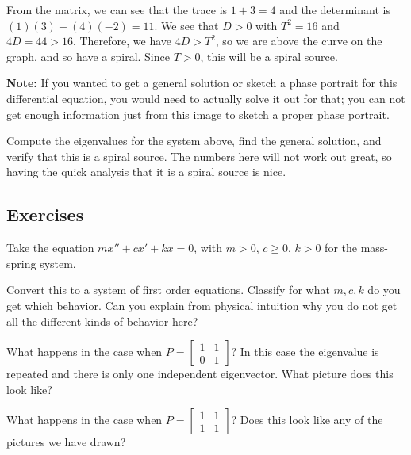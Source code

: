 \begin{exampleSol}
From the matrix, we can see that the trace is $1 + 3  = 4$ and the determinant is $(1)(3) - (4)(-2) = 11$. We see that $D > 0$ with $T^2 = 16$ and $4D = 44 > 16$. Therefore, we have $4D > T^2$, so we are above the curve on the graph, and so have a spiral. Since $T > 0$, this will be a spiral source. 

\textbf{Note:} If you wanted to get a general solution or sketch a phase portrait for this differential equation, you would need to actually solve it out for that; you can not get enough information just from this image to sketch a proper phase portrait.
\end{exampleSol}

\begin{exercise}
Compute the eigenvalues for the system above, find the general solution, and verify that this is a spiral source. The numbers here will not work out great, so having the quick analysis that it is a spiral source is nice. 
\end{exercise} 
 

\subsection{Exercises}

\begin{exercise}
Take the equation $m x'' + c x' + kx = 0$, with $m > 0$, $c \geq 0$, $k > 0$
for the mass-spring system.
\begin{tasks}
\task Convert this to a system of first
order equations.
\task Classify for what $m, c, k$ do you get which behavior.
\task Can you explain from physical intuition why you do not get all the
different kinds of behavior here?
\end{tasks}
\end{exercise}

\begin{exercise}
What happens in the case when $P = 
\left[ \begin{smallmatrix} 1 & 1 \\ 0 & 1 \end{smallmatrix} \right]$?  In
this case the eigenvalue is repeated and there is only one independent eigenvector.
What
picture does this look like?
\end{exercise}

\begin{exercise}
What happens in the case when $P = 
\left[ \begin{smallmatrix} 1 & 1 \\ 1 & 1 \end{smallmatrix} \right]$?
Does this look like any of the pictures we have drawn?
\end{exercise}

